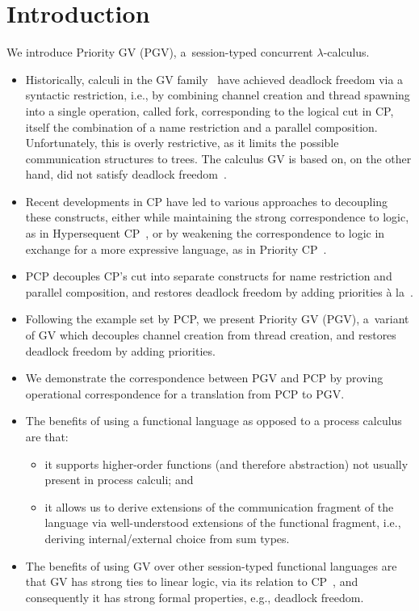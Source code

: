 \documentclass[main.tex]{subfiles}
\begin{document}
\section{Introduction}

We introduce Priority GV (PGV), a~session-typed concurrent $\lambda$-calculus.

\begin{itemize}
\item
  Historically, calculi in the GV family~\cite{wadler15,lindleymorris15} have achieved deadlock freedom via a syntactic restriction, i.e., by combining channel creation and thread spawning into a single operation, called fork, corresponding to the logical cut in CP, itself the combination of a name restriction and a parallel composition.
  Unfortunately, this is overly restrictive, as it limits the possible communication structures to trees. The calculus GV is based on, on the other hand, did not satisfy deadlock freedom~\cite{gayvasconcelos12}.
\item
  Recent developments in CP have led to various approaches to decoupling these constructs, either while maintaining the strong correspondence to logic, as in Hypersequent CP~\cite[HCP]{kokkemontesi19popl,kokkemontesi19tlla}, or by weakening the correspondence to logic in exchange for a more expressive language, as in Priority CP~\cite[PCP]{dardhagay18}.
\item
  PCP decouples CP's cut into separate constructs for name restriction and parallel composition, and restores deadlock freedom by adding priorities \`{a} la~\cite{kobayashi06}.
\item
  Following the example set by PCP, we present Priority GV (PGV), a~variant of GV which decouples channel creation from thread creation, and restores deadlock freedom by adding priorities.
\item
  We demonstrate the correspondence between PGV and PCP by proving operational correspondence for a translation from PCP to PGV.
\item
  The benefits of using a functional language as opposed to a process calculus are that:
  \begin{itemize}
  \item 
    it supports higher-order functions (and therefore abstraction) not usually present in process calculi; and
  \item
    it allows us to derive extensions of the communication fragment of the language via well-understood extensions of the functional fragment, i.e., deriving internal/external choice from sum types.
  \end{itemize}
\item
  The benefits of using GV over other session-typed functional languages are that GV has strong ties to linear logic, via its relation to CP~\cite{wadler15}, and consequently it has strong formal properties, e.g., deadlock freedom.
\end{itemize}
\end{document}
